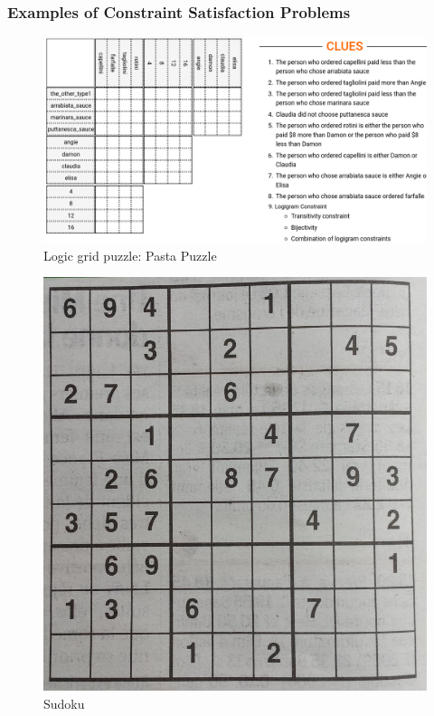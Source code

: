 \documentclass{beamer}
\begin{document}
	\begin{frame}
	\frametitle{Examples of Constraint Satisfaction Problems}
		\begin{minipage}[t]{0.6\textwidth}
			\begin{figure}[h]
				\includegraphics[width=\textwidth]{figures/logic_puzzle.png}
				\caption{Logic grid puzzle: Pasta Puzzle}
			\end{figure}
		\end{minipage}
	\hfill
			\begin{minipage}[t]{0.29\textwidth}
			\begin{figure}[h]
				\includegraphics[width=\textwidth]{figures/sudoku.jpg}
				\caption{Sudoku}
			\end{figure}
		\end{minipage}
	\end{frame}
\end{document}
